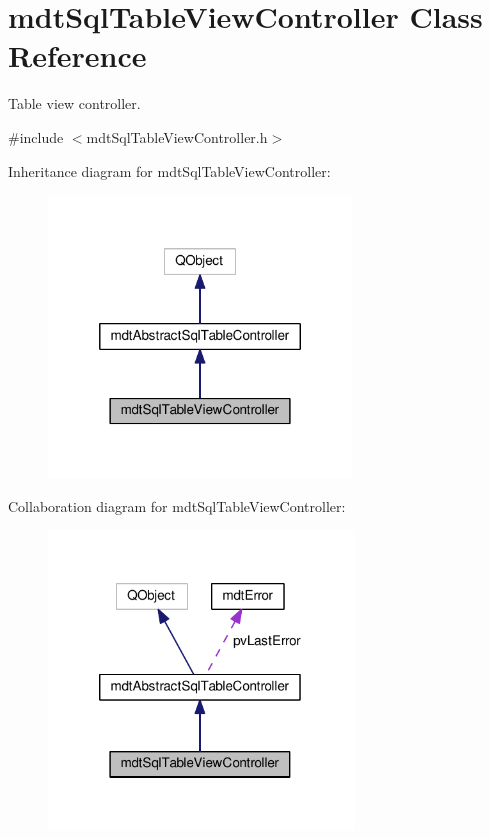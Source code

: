 \hypertarget{classmdt_sql_table_view_controller}{\section{mdt\-Sql\-Table\-View\-Controller Class Reference}
\label{classmdt_sql_table_view_controller}
}


Table view controller.  




{\ttfamily \#include $<$mdt\-Sql\-Table\-View\-Controller.\-h$>$}



Inheritance diagram for mdt\-Sql\-Table\-View\-Controller\-:
\nopagebreak
\begin{figure}[H]
\begin{center}
\leavevmode
\includegraphics[width=228pt]{classmdt_sql_table_view_controller__inherit__graph}
\end{center}
\end{figure}


Collaboration diagram for mdt\-Sql\-Table\-View\-Controller\-:
\nopagebreak
\begin{figure}[H]
\begin{center}
\leavevmode
\includegraphics[width=230pt]{classmdt_sql_table_view_controller__coll__graph}
\end{center}
\end{figure}
